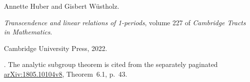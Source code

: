 Annette Huber and Gisbert W{\"u}stholz.

\newblock \emph{Transcendence and linear relations of 1-periods}, volume 227 of
  \emph{Cambridge Tracts in Mathematics}.

\newblock Cambridge University Press, 2022.

\newblock {}.
\newblock The analytic subgroup theorem is cited from the separately paginated
  \href{https://arxiv.org/abs/1805.10104v8}{arXiv:1805.10104v8}, Theorem~6.1, p.~43.
